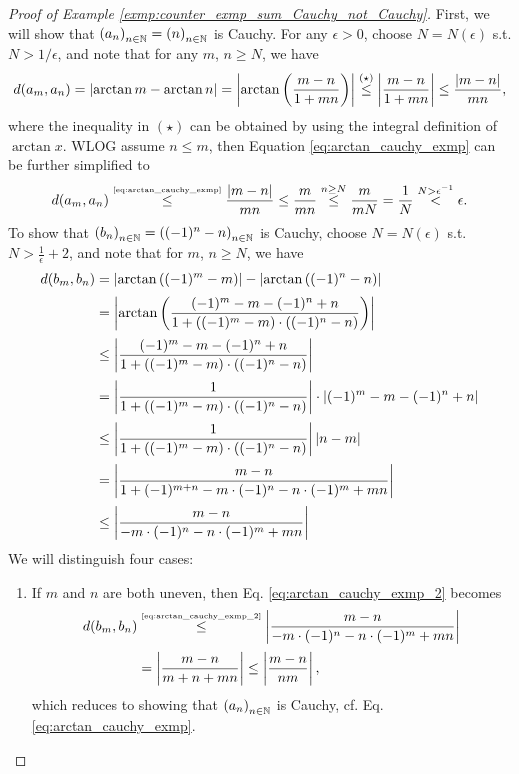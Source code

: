 \begin{proof}[Proof of Example \ref{exmp:counter_exmp_sum_Cauchy_not_Cauchy}]
	First, we will show that $\seq[a_n] = \seq[n]$ is Cauchy. For any $\epsilon > 0$, choose $N = N(\epsilon)$ s.t. $N > 1/\epsilon$, and note that for any $m$, $n\geq N$, we have
	\begin{align}\label{eq:arctan_cauchy_exmp}
		d(a_m, a_n) = \abs{\arctan m - \arctan n} = \abs{\arctan\left(\frac{m - n}{1 + mn}\right)} \overset{(\star)}{\leq} \abs{\frac{m - n}{1 + mn}} \leq \frac{\abs{m - n}}{mn},
	\end{align}
	where the inequality in $(\star)$ can be obtained by using the integral definition of $\arctan x$. WLOG assume $n\leq m$, then Equation \eqref{eq:arctan_cauchy_exmp} can be further simplified to
	\begin{align*}
		d(a_m, a_n) \overset{\tiny\eqref{eq:arctan_cauchy_exmp}}{\leq} \frac{\abs{m - n}}{mn} \leq \frac{m}{mn} \overset{n\geq N}{\leq}\frac{m}{mN} = \frac{1}{N} \overset{N > \epsilon^{-1}}{<} \epsilon. 
	\end{align*}
	To show that $\seq[b_n] = \seq[(-1)^n - n]$ is Cauchy, choose $N = N(\epsilon)$ s.t. $N > \frac{1}{\epsilon} + 2$, and note that for $m$, $n\geq N$, we have
	\begin{align}
		d(b_m, b_n) &= \abs{\arctan\left((-1)^m - m\right)} - \abs{\arctan\left((-1)^n - n\right)} \\[2pt] &= \abs{\arctan\left( \frac{(-1)^m - m - (-1)^n+n}{1 + \left((-1)^m - m\right) \cdot \left((-1)^n -n\right) } \right)} 
		\\[2pt] &\leq \abs{\frac{(-1)^m - m - (-1)^n+n}{1 + \left((-1)^m - m\right) \cdot \left((-1)^n -n\right) }} 
		\\[2pt] &= \abs{\frac{1}{1 + \left((-1)^m - m\right) \cdot \left((-1)^n -n\right)}}\cdot \abs{(-1)^m - m - (-1)^n+n}
		\\[2pt] &\leq  \abs{\frac{1}{1 + \left((-1)^m - m\right) \cdot \left((-1)^n -n\right)}}\abs{n - m} 
		\\[2pt] &= \abs{\frac{m - n}{1 + (-1)^{m + n} - m \cdot (-1)^n -n\cdot (-1)^m + mn}}
		\\[2pt] &\leq \abs{\frac{m - n}{- m \cdot (-1)^n -n\cdot (-1)^m + mn}} \label{eq:arctan_cauchy_exmp_2}
	\end{align}
	We will distinguish four cases:
	\begin{enumerate}
		\item If $m$ and $n$ are both uneven, then Eq. \eqref{eq:arctan_cauchy_exmp_2} becomes 
		\begin{align*}
			d(b_m, b_n) &\overset{\tiny\eqref{eq:arctan_cauchy_exmp_2}}{\leq} \abs{\frac{m - n}{- m \cdot (-1)^n -n\cdot (-1)^m + mn}}
			\\[2pt] &= \abs{\frac{m - n}{m + n + mn}} \leq \abs{\frac{m - n}{nm}},
		\end{align*}
		which reduces to showing that $\seq[a_n]$ is Cauchy, cf. Eq. \eqref{eq:arctan_cauchy_exmp}.
		

\end{enumerate}
\end{proof}
